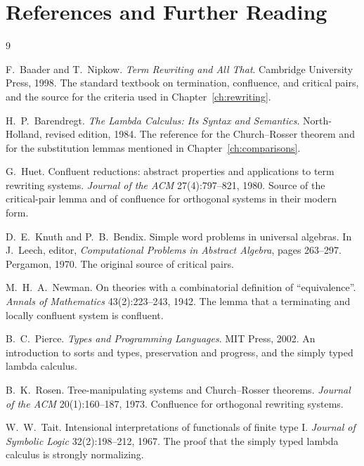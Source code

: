 \chapter*{References and Further Reading}

\begin{thebibliography}{9}\setlength{\itemsep}{3pt}

 F.~Baader and T.~Nipkow. \emph{Term Rewriting and All That}. Cambridge University Press, 1998. The standard textbook on termination, confluence, and critical pairs, and the source for the criteria used in Chapter~\ref{ch:rewriting}.

 H.~P.~Barendregt. \emph{The Lambda Calculus: Its Syntax and Semantics}. North-Holland, revised edition, 1984. The reference for the Church--Rosser theorem and for the substitution lemmas mentioned in Chapter~\ref{ch:comparisons}.

 G.~Huet. Confluent reductions: abstract properties and applications to term rewriting systems. \emph{Journal of the ACM} 27(4):797--821, 1980. Source of the critical-pair lemma and of confluence for orthogonal systems in their modern form.

 D.~E.~Knuth and P.~B.~Bendix. Simple word problems in universal algebras. In J.~Leech, editor, \emph{Computational Problems in Abstract Algebra}, pages 263--297. Pergamon, 1970. The original source of critical pairs.

 M.~H.~A.~Newman. On theories with a combinatorial definition of ``equivalence''. \emph{Annals of Mathematics} 43(2):223--243, 1942. The lemma that a terminating and locally confluent system is confluent.

 B.~C.~Pierce. \emph{Types and Programming Languages}. MIT Press, 2002. An introduction to sorts and types, preservation and progress, and the simply typed lambda calculus.

 B.~K.~Rosen. Tree-manipulating systems and Church--Rosser theorems. \emph{Journal of the ACM} 20(1):160--187, 1973. Confluence for orthogonal rewriting systems.

 W.~W.~Tait. Intensional interpretations of functionals of finite type I. \emph{Journal of Symbolic Logic} 32(2):198--212, 1967. The proof that the simply typed lambda calculus is strongly normalizing.

\end{thebibliography}
